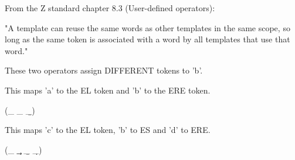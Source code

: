From the Z standard chapter 8.3 (User-defined operators):

  "A template can reuse the same words as other templates in the same scope,
   so long as the same token is associated with a word by all templates that
   use that word."

These two operators assign DIFFERENT tokens to 'b'.

This maps 'a' to the EL token and 'b' to the ERE token.
\begin{zed}
 \leftassoc (\_ \a \_ \b \_)
\end{zed}

This maps 'c' to the EL token, 'b' to ES and 'd' to ERE.
\begin{zed}
 \leftassoc (\_ \c \_ \b \_ \d \_)
\end{zed}
